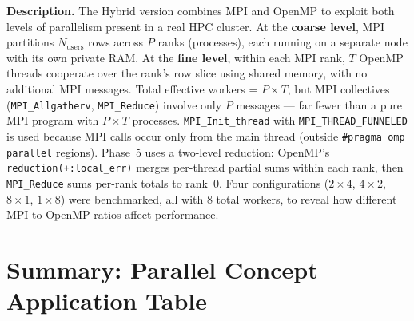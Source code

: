 \documentclass[12pt,a4paper]{article}
\begin{document}
\begin{mdframed}[style=descbox]
\textbf{Description.}  The Hybrid version combines MPI and OpenMP to exploit
both levels of parallelism present in a real HPC cluster.  At the
\textbf{coarse level}, MPI partitions $N_{\text{users}}$ rows across $P$
ranks (processes), each running on a separate node with its own private RAM.
At the \textbf{fine level}, within each MPI rank, $T$ OpenMP threads
cooperate over the rank's row slice using shared memory, with no additional
MPI messages.  Total effective workers = $P \times T$, but MPI collectives
(\texttt{MPI\_Allgatherv}, \texttt{MPI\_Reduce}) involve only $P$ messages
— far fewer than a pure MPI program with $P \times T$ processes.
\texttt{MPI\_Init\_thread} with \texttt{MPI\_THREAD\_FUNNELED} is used
because MPI calls occur only from the main thread (outside
\texttt{\#pragma omp parallel} regions).  Phase~5 uses a two-level reduction:
OpenMP's \texttt{reduction(+:local\_err)} merges per-thread partial sums
within each rank, then \texttt{MPI\_Reduce} sums per-rank totals to rank~0.
Four configurations ($2{\times}4$, $4{\times}2$, $8{\times}1$, $1{\times}8$)
were benchmarked, all with 8 total workers, to reveal how different
MPI-to-OpenMP ratios affect performance.
\end{mdframed}

\newpage

\section{Summary: Parallel Concept Application Table}
\end{document}
